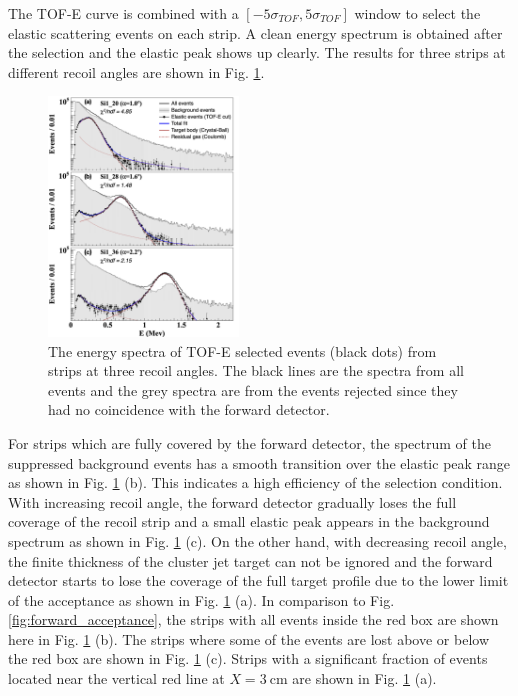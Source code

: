 \documentclass[number,5p]{elsarticle}
\begin{document}
The TOF-E curve is combined with a $[-5\sigma_{TOF}, 5\sigma_{TOF}]$ window to select the elastic scattering events on each strip.
A clean energy spectrum is obtained after the selection and the elastic peak shows up clearly.
The results for three strips at different recoil angles are shown in Fig. \ref{fig:cut}.
\begin{figure}[tb!]
  \centering
  \includegraphics[width=0.45\textwidth]{./tofe_cut_comparison.png}
  \caption{The energy spectra of TOF-E selected events (black dots) from strips at three recoil angles. The black lines are the spectra from all events and the grey spectra are from the events rejected since they had no coincidence with the forward detector.}
  \label{fig:cut}
\end{figure}
For strips which are fully covered by the forward detector, the spectrum of the
suppressed background events has a smooth transition over the elastic peak range
as shown in Fig. \ref{fig:cut} (b).
This indicates a high efficiency of the selection condition.
With increasing recoil angle, the forward detector gradually loses the full coverage
of the recoil strip and a small elastic peak appears in the background spectrum
as shown in Fig. \ref{fig:cut} (c).
On the other hand, with decreasing recoil angle, the finite thickness of the
cluster jet target can not be ignored and the forward detector starts to lose the coverage of the full target profile due
to the lower limit of the acceptance as shown in Fig. \ref{fig:cut} (a).
In comparison to Fig. \ref{fig:forward_acceptance}, the strips with all events
inside the red box are shown here in Fig. \ref{fig:cut} (b).
The strips where some of the events are lost above or below the red box are
shown in Fig. \ref{fig:cut} (c).
Strips with a significant fraction of events located near the vertical red line
at $X = \SI{3}{\cm}$ are shown in Fig. \ref{fig:cut} (a).
\end{document}
